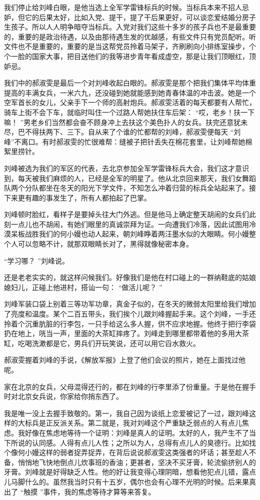 \documentclass[12pt,twoside,openany]{book}
\begin{document}
我们停止给刘峰白眼，是他当选上全军学雷锋标兵的时候。当标兵本来不招人忌妒，但它的后果太好，比如入党、提干，提了干后果更好，可以谈恋爱结婚分房子生孩子。所以人人明争暗夺当标兵。入党对我们这些十多岁的孩子兵也不是最重要的，重要的是政治待遇，以及由那待遇生发的优越感，有些文件只有党员配听。听文件也不是重要的，重要的是当这帮党员拎着马架子，齐刷刷向小排练室操步，个个一脸的国家大事，把目送他们的我等进步青年看成虚空，那是让我们顶眼红，顶妒忌。

我们中的郝淑雯是最后一个对刘峰收起白眼的。郝淑雯是那个把我们集体平均体重提高的丰满女兵，一米六九，还没碰到她就能感到她青春体温的冲击波。她是一个空军首长的女儿，父亲手下一个师的高射炮兵。郝淑雯活着的每天都要有人帮忙，骑车上街不会下车，就临时叫住一个过路人帮她扶住车后架： “哎，老乡！扶一下嘛！ ”男老乡们当然都会奋不顾身冲上去扶这个美色扑人的女兵。扶完还意犹未尽，巴不得扶两下、三下。自从来了个谁的忙都帮的刘峰，郝淑雯便每天 “刘峰”不离口。有时郝淑雯的忙很难帮：缝被子把针丢失在棉花套里，让刘峰帮她棉絮里捞针。

刘峰被选为我们的军区的代表，去北京参加全军学雷锋标兵大会，我们这才意识到，每天被我们麻烦的人，已经是全军的明星了。他从北京回来那天，我们女舞蹈队两个分队都坐在冬天的阳光下学文件，不知怎么冲着归营的标兵全站起来了。接下来更有趣的事发生了，所有人都拍起了巴掌。

刘峰顿时脸红，看样子是要掉头往大门外逃。但是他马上确定整天胡闹的女兵们此刻一点儿也不胡闹，有她们眼里的真诚崇拜为证。一向遭我们冷落，因此试图用冷漠呆板战胜我们的何小嫚也动人起来，朝刘峰睁着两汪墨水似的大眼睛。何小嫚整个人可以忽略不计，就那双眼睛长对了，黑得就像秘密本身。

“学习哪？ ”刘峰说。

还是老老实实的，就这样问候我们。好像我们是他在村口碰上的一群纳鞋底的姑娘媳妇儿，正碰上他进村，搭讪一句： “做活儿呢？ ”

刘峰军装口袋上别着三等功军功章，真金子似的，在冬天的微弱太阳里给我们增加了亮度和温度。某个二百五带头，我们挨个儿跟刘峰握起手来。这个刘峰，一手还拎着个沉重肮脏的行李包，一只手给这么多人握，供不应求地握。他终于把行李袋扔在地上，咣当一声，里面的大茶缸摔疼了。刘峰走到哪里都带着他的多用大茶缸，吃喝洗漱都是它，男兵们开玩笑说，还可以用它舀水救火。

郝淑雯握着刘峰的手说，《解放军报》上登了他们会议的照片，她在上面找过他呢。

家在北京的女兵，父母混得还行的，都在刘峰的行李里添了份重量。于是他在握手时对北京女兵说，你家给你捎东西了。

我是唯一没上去握手致敬的。第一，我自己因为谈纸上恋爱被记了一过，跟刘峰这样的大标兵是正反派关系。第二就是，我对刘峰这个严重缺乏弱点的人有点儿焦虑。我好像在焦虑地等待一个证明：刘峰是真人的证明。太好的人，我产生不了当下所说的认同感。人得有点儿人性；之所以为人，总得有点儿人的臭德行。比如找个像何小嫚这样的弱者捉弄捉弄，在背后说说郝淑雯这类强者的坏话；甚至趁人不备，悄悄地飞快地倒点儿炊事班的香油；更甚者，坚决不买牙膏，轮流偷挤别人的牙膏。刘峰就是好得缺乏人性。他的好让我变得心理阴暗，想看他犯点儿错，露点儿马脚什么的。虽然我当时只有十五岁，偶尔也会有心理不光明的时候。后来果真出了 “触摸 ”事件，我的焦虑等待才算等来答复。
\end{document}
